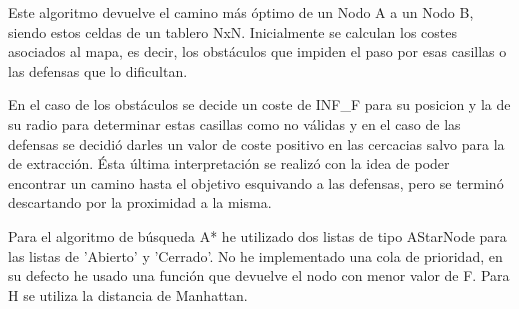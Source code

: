 Este algoritmo devuelve el camino más óptimo de un Nodo A a un Nodo B, siendo estos celdas de un tablero NxN. Inicialmente se calculan los costes asociados al mapa, es decir, los obstáculos que impiden el paso por esas casillas o las defensas que lo dificultan.

En el caso de los obstáculos se decide un coste de INF_F para su posicion y la de su radio para determinar estas casillas como no válidas y en el caso de las defensas se decidió darles un valor de coste positivo en las cercacias salvo para la de extracción. Ésta última interpretación se realizó con la idea de poder encontrar un camino hasta el objetivo esquivando a las defensas, pero se terminó descartando por la proximidad a la misma. 

Para el algoritmo de búsqueda A* he utilizado dos listas de tipo AStarNode para las listas de 'Abierto' y 'Cerrado'. No he implementado una cola de prioridad, en su defecto he usado una función que devuelve el nodo con menor valor de F. Para H se utiliza la distancia de Manhattan.

